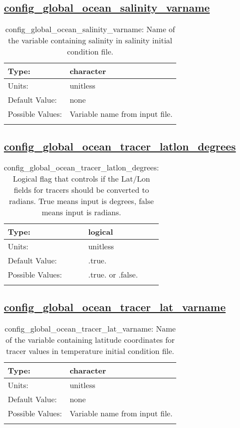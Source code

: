 \subsection[config\_global\_ocean\_salinity\_varname]{\hyperref[sec:nm_tab_global_ocean]{config\_global\_ocean\_salinity\_varname}}
\label{subsec:nm_sec_config_global_ocean_salinity_varname}
\begin{center}
\begin{longtable}{| p{2.0in} || p{4.0in} |}
    \hline
    Type: & character \\
    \hline
    Units: & \si{unitless} \\
    \hline
    Default Value: & none \\
    \hline
    Possible Values: & Variable name from input file. \\
    \hline
    \caption{config\_global\_ocean\_salinity\_varname: Name of the variable containing salinity in salinity initial condition file.}
\end{longtable}
\end{center}
\subsection[config\_global\_ocean\_tracer\_latlon\_degrees]{\hyperref[sec:nm_tab_global_ocean]{config\_global\_ocean\_tracer\_latlon\_degrees}}
\label{subsec:nm_sec_config_global_ocean_tracer_latlon_degrees}
\begin{center}
\begin{longtable}{| p{2.0in} || p{4.0in} |}
    \hline
    Type: & logical \\
    \hline
    Units: & \si{unitless} \\
    \hline
    Default Value: & .true. \\
    \hline
    Possible Values: & .true. or .false. \\
    \hline
    \caption{config\_global\_ocean\_tracer\_latlon\_degrees: Logical flag that controls if the Lat/Lon fields for tracers should be converted to radians. True means input is degrees, false means input is radians.}
\end{longtable}
\end{center}
\subsection[config\_global\_ocean\_tracer\_lat\_varname]{\hyperref[sec:nm_tab_global_ocean]{config\_global\_ocean\_tracer\_lat\_varname}}
\label{subsec:nm_sec_config_global_ocean_tracer_lat_varname}
\begin{center}
\begin{longtable}{| p{2.0in} || p{4.0in} |}
    \hline
    Type: & character \\
    \hline
    Units: & \si{unitless} \\
    \hline
    Default Value: & none \\
    \hline
    Possible Values: & Variable name from input file. \\
    \hline
    \caption{config\_global\_ocean\_tracer\_lat\_varname: Name of the variable containing latitude coordinates for tracer values in temperature initial condition file.}
\end{longtable}
\end{center}
